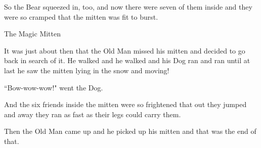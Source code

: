 \documentclass{article}
\begin{document}
So the Bear squeezed in, too, and now there were seven of them inside and they were so cramped that the mitten was fit to burst.

The Magic Mitten

It was just about then that the Old Man missed his mitten and decided to go back in search of it. He walked and he walked and his Dog ran and ran until at last he saw the mitten lying in the snow and moving!

``Bow-wow-wow!" went the Dog.

And the six friends inside the mitten were so frightened that out they jumped and away they ran as fast as their legs could carry them.

Then the Old Man came up and he picked up his mitten and that was the end of that.
\end{document}
